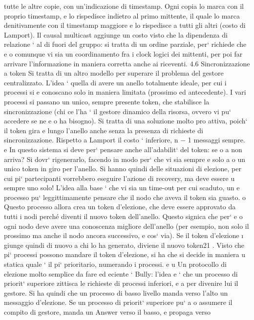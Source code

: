 \documentclass[a4paper,12pt]{article}
\begin{document}
tutte le altre copie, con un'indicazione di timestamp. Ogni copia lo marca con il proprio timestamp, e lo rispedisce
indietro al primo mittente, il
quale lo marca denitivamente con il timestamp maggiore e lo rispedisce
a tutti gli altri (costo di Lamport).
Il causal multicast aggiunge un costo visto che la dipendenza di relazione
` al di fuori del gruppo: si tratta di un ordine parziale, per` richiede che
e
o
comunque vi sia un coordinamento fra i clock logici dei mittenti, per poi
far arrivare l'informazione in maniera corretta anche ai riceventi.
4.6
Sincronizzazione a token
Si tratta di un altro modello per superare il problema del gestore centralizzato. L'idea ` quella di avere un anello
totalmente ideale, per cui i processi si
e
conoscano solo in maniera limitata (prossimo ed antecedente). I vari processi
si passano un unico, sempre presente token, che stabilisce la sincronizzazione
(chi ce l'ha ` il gestore dinamico della risorsa, ovvero vi pu` accedere se ne
e
o
ha bisogno). Si tratta di una soluzione molto pro attiva, poich` il token gira
e
lungo l'anello anche senza la presenza di richieste di sincronizzazione. Rispetto
a Lamport il costo ` inferiore, n $-$ 1 messaggi sempre.
e
In questo sistema si deve per` pensare anche all'adabilit` del token: se
o
a
non arriva? Si dovr` rigenerarlo, facendo in modo per` che vi sia sempre e solo
a
o
un unico token in giro per l'anello. Si hanno quindi delle situazioni di elezione,
per cui pi` partecipanti vorrebbero eseguire l'azione di recovery, ma deve essere
u
sempre uno solo! L'idea alla base ` che vi sia un time-out per cui scaduto, un
e
processo pu` leggittimamente pensare che il nodo che aveva il token sia guasto.
o
Questo processo allora crea un token d'elezione, che deve essere approvato da
tutti i nodi perché diventi il nuovo token dell'anello. Questo signica che per`
e
o
ogni nodo deve avere una conoscenza migliore dell'anello (per esempio, non solo
il prossimo ma anche il nodo ancora successivo, e cos` via). Se il token d'elezione
\i{}
giunge quindi di nuovo a chi lo ha generato, diviene il nuovo token21 . Visto che
pi` processi possono mandare il token d'elezione, si ha che si decide in maniera
u
statica quale ` il pi` prioritario, numerando i processi.
e
u
Un protocollo di elezione molto semplice da fare ed eciente ` Bully: l'idea
e
` che un processo di priorit` superiore zittisca le richieste di processi inferiori,
e
a
per divenire lui il gestore. Si ha quindi che un processo di basso livello manda
verso l'alto un messaggio d'elezione. Se un processo di priorit` superiore pu`
a
o
assumere il compito di gestore, manda un Answer verso il basso, e propaga verso
\end{document}

